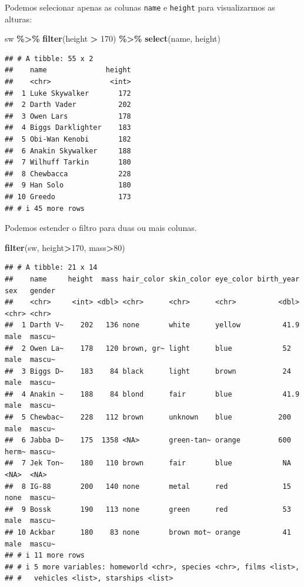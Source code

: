 \documentclass[
]{book}
\newenvironment{Shaded}{\begin{snugshade}}{\end{snugshade}}
\newcommand{\DecValTok}[1]{\textcolor[rgb]{0.00,0.00,0.81}{#1}}
\newcommand{\FunctionTok}[1]{\textcolor[rgb]{0.13,0.29,0.53}{\textbf{#1}}}
\newcommand{\NormalTok}[1]{#1}
\newcommand{\SpecialCharTok}[1]{\textcolor[rgb]{0.81,0.36,0.00}{\textbf{#1}}}
\begin{document}
Podemos selecionar apenas as colunas \texttt{name} e \texttt{height} para
visualizarmos as alturas:

\begin{Shaded}
\begin{Highlighting}[]
\NormalTok{sw }\SpecialCharTok{\%\textgreater{}\%} 
  \FunctionTok{filter}\NormalTok{(height }\SpecialCharTok{\textgreater{}} \DecValTok{170}\NormalTok{) }\SpecialCharTok{\%\textgreater{}\%} 
  \FunctionTok{select}\NormalTok{(name, height)}
\end{Highlighting}
\end{Shaded}

\begin{verbatim}
## # A tibble: 55 x 2
##    name              height
##    <chr>              <int>
##  1 Luke Skywalker       172
##  2 Darth Vader          202
##  3 Owen Lars            178
##  4 Biggs Darklighter    183
##  5 Obi-Wan Kenobi       182
##  6 Anakin Skywalker     188
##  7 Wilhuff Tarkin       180
##  8 Chewbacca            228
##  9 Han Solo             180
## 10 Greedo               173
## # i 45 more rows
\end{verbatim}

Podemos estender o filtro para duas ou mais colunas.

\begin{Shaded}
\begin{Highlighting}[]
\FunctionTok{filter}\NormalTok{(sw, height}\SpecialCharTok{\textgreater{}}\DecValTok{170}\NormalTok{, mass}\SpecialCharTok{\textgreater{}}\DecValTok{80}\NormalTok{)}
\end{Highlighting}
\end{Shaded}

\begin{verbatim}
## # A tibble: 21 x 14
##    name     height  mass hair_color skin_color eye_color birth_year sex   gender
##    <chr>     <int> <dbl> <chr>      <chr>      <chr>          <dbl> <chr> <chr> 
##  1 Darth V~    202   136 none       white      yellow          41.9 male  mascu~
##  2 Owen La~    178   120 brown, gr~ light      blue            52   male  mascu~
##  3 Biggs D~    183    84 black      light      brown           24   male  mascu~
##  4 Anakin ~    188    84 blond      fair       blue            41.9 male  mascu~
##  5 Chewbac~    228   112 brown      unknown    blue           200   male  mascu~
##  6 Jabba D~    175  1358 <NA>       green-tan~ orange         600   herm~ mascu~
##  7 Jek Ton~    180   110 brown      fair       blue            NA   <NA>  <NA>  
##  8 IG-88       200   140 none       metal      red             15   none  mascu~
##  9 Bossk       190   113 none       green      red             53   male  mascu~
## 10 Ackbar      180    83 none       brown mot~ orange          41   male  mascu~
## # i 11 more rows
## # i 5 more variables: homeworld <chr>, species <chr>, films <list>,
## #   vehicles <list>, starships <list>
\end{verbatim}
\end{document}
